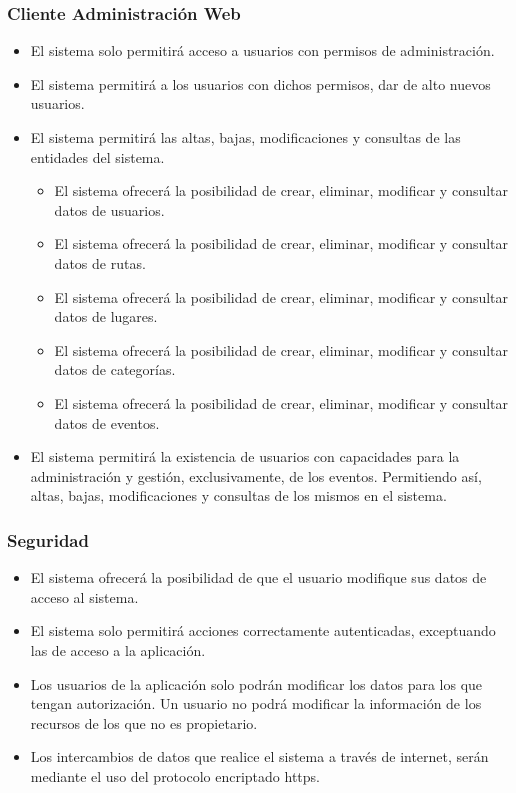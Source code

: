 \subsubsection*{Cliente Administración Web}
\begin{itemize}
\setlength\itemsep{1pt}
\item El sistema solo permitirá acceso a usuarios con permisos de administración.
\item El sistema permitirá a los usuarios con dichos permisos, dar de alto nuevos usuarios.
\item El sistema permitirá las altas, bajas, modificaciones y consultas de las entidades del sistema.
	\begin{itemize}
	\item El sistema ofrecerá la posibilidad de crear, eliminar, modificar y consultar datos de usuarios.
	\item El sistema ofrecerá la posibilidad de crear, eliminar, modificar y consultar datos de rutas.
	\item El sistema ofrecerá la posibilidad de crear, eliminar, modificar y consultar datos de lugares.
	\item El sistema ofrecerá la posibilidad de crear, eliminar, modificar y consultar datos de categorías.
	\item El sistema ofrecerá la posibilidad de crear, eliminar, modificar y consultar datos de eventos.
	\end{itemize}
\item El sistema permitirá la existencia de usuarios con capacidades para la administración y gestión, exclusivamente, de los eventos. Permitiendo así, altas, bajas, modificaciones y consultas de los mismos en el sistema.
\end{itemize}

\subsubsection*{Seguridad}
\begin{itemize}
\setlength\itemsep{1pt}
\item El sistema ofrecerá la posibilidad de que el usuario modifique sus datos de acceso al sistema.
\item El sistema solo permitirá acciones correctamente autenticadas, exceptuando las de acceso a la aplicación.
\item Los usuarios de la aplicación solo podrán modificar los datos para los que tengan autorización. Un usuario no podrá modificar la información de los recursos de los que no es propietario.
\item Los intercambios de datos que realice el sistema a través de internet, serán mediante el uso del protocolo encriptado https.
\end{itemize}


